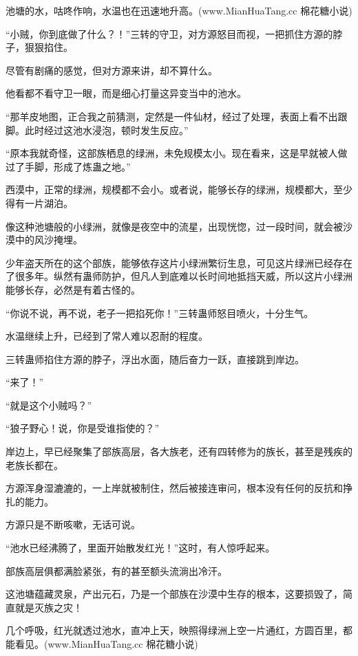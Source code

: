 
\begin{this_body}

池塘的水，咕咚作响，水温也在迅速地升高。(www.MianHuaTang.cc 棉花糖小说)

“小贼，你到底做了什么？！”三转的守卫，对方源怒目而视，一把抓住方源的脖子，狠狠掐住。

尽管有剧痛的感觉，但对方源来讲，却不算什么。

他看都不看守卫一眼，而是细心打量这异变当中的池水。

“那羊皮地图，正合我之前猜测，定然是一件仙材，经过了处理，表面上看不出跟脚。此时经过这池水浸泡，顿时发生反应。”

“原本我就奇怪，这部族栖息的绿洲，未免规模太小。现在看来，这是早就被人做过了手脚，形成了炼蛊之地。”

西漠中，正常的绿洲，规模都不会小。或者说，能够长存的绿洲，规模都大，至少得有一片湖泊。

像这种池塘般的小绿洲，就像是夜空中的流星，出现恍惚，过一段时间，就会被沙漠中的风沙掩埋。

少年盗天所在的这个部族，能够依存这片小绿洲繁衍生息，可见这片绿洲已经存在了很多年。纵然有蛊师防护，但凡人到底难以长时间地抵挡天威，所以这片小绿洲能够长存，必然是有着古怪的。

“你说不说，再不说，老子一把掐死你！”三转蛊师怒目喷火，十分生气。

水温继续上升，已经到了常人难以忍耐的程度。

三转蛊师掐住方源的脖子，浮出水面，随后奋力一跃，直接跳到岸边。

“来了！”

“就是这个小贼吗？”

“狼子野心！说，你是受谁指使的？”

岸边上，早已经聚集了部族高层，各大族老，还有四转修为的族长，甚至是残疾的老族长都在。

方源浑身湿漉漉的，一上岸就被制住，然后被接连审问，根本没有任何的反抗和挣扎的能力。

方源只是不断咳嗽，无话可说。

“池水已经沸腾了，里面开始散发红光！”这时，有人惊呼起来。

部族高层俱都满脸紧张，有的甚至额头流淌出冷汗。

这池塘蕴藏灵泉，产出元石，乃是一个部族在沙漠中生存的根本，这要损毁了，简直就是灭族之灾！

几个呼吸，红光就透过池水，直冲上天，映照得绿洲上空一片通红，方圆百里，都能看见。(www.MianHuaTang.cc 棉花糖小说)


\end{this_body}
